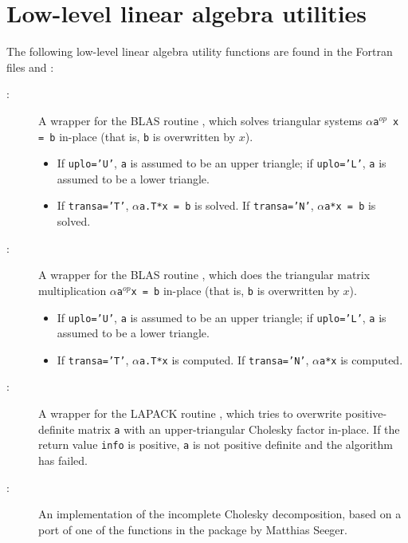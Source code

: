 \documentclass[]{manual}
\begin{document}
\section{Low-level linear algebra utilities}
The following low-level linear algebra utility functions are found in the Fortran files  and  :
\begin{description}

    \item[:] A wrapper for the BLAS routine , which solves triangular systems \texttt{$\alpha$a$^{op}$ x = b} in-place (that is, \texttt{b} is overwritten by $x$).
    \begin{itemize}
        \item If \texttt{uplo='U'}, \texttt{a} is assumed to be an upper triangle; if \texttt{uplo='L'}, \texttt{a} is assumed to be a lower triangle.
        \item If \texttt{transa='T'}, \texttt{$\alpha$a.T*x = b} is solved. If \texttt{transa='N'}, \texttt{$\alpha$a*x = b} is solved.
    \end{itemize}

    \item[:] A wrapper for the BLAS routine , which does the triangular matrix multiplication \texttt{$\alpha$a$^{op}$x = b} in-place (that is, \texttt{b} is overwritten by $x$).
    \begin{itemize}
        \item If \texttt{uplo='U'}, \texttt{a} is assumed to be an upper triangle; if \texttt{uplo='L'}, \texttt{a} is assumed to be a lower triangle.
        \item If \texttt{transa='T'}, \texttt{$\alpha$a.T*x} is computed. If \texttt{transa='N'}, \texttt{$\alpha$a*x} is computed.
    \end{itemize}

    \item[:] A wrapper for the LAPACK routine , which tries to overwrite positive-definite matrix \texttt{a} with an upper-triangular Cholesky factor in-place. If the return value \texttt{info} is positive, \texttt{a} is not positive definite and the algorithm has failed.

    \item[:] An implementation of the incomplete Cholesky decomposition, based on a port of one of the functions in the  package by Matthias Seeger.


\end{description}
\end{document}
